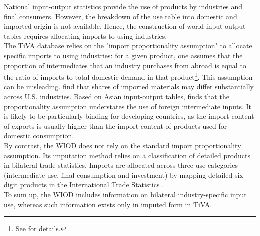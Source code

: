 \documentclass[11pt,a4paper]{article}
\begin{document}
National input-output statistics provide the use of products by industries and final consumers. 
However, the breakdown of the use table into domestic and imported origin is not available. 
Hence, the construction of world input-output tables requires allocating imports to using industries.\\
The TiVA database relies on the "import proportionality assumption" to allocate specific imports to using industries: for a given product, one assumes that the proportion of intermediates that an industry purchases from abroad is equal to the ratio of imports to total domestic demand in that product\footnote{See \cite{OECD2011} for details.}. 
This assumption can be misleading. \cite{Feenstra2012} find that shares of imported materials may differ substantially across U.S. industries. Based on Asian input-output tables, \cite{Puzzello2012} finds that the proportionality assumption understates the use of foreign intermediate inputs. It is likely to be particularly binding for developing countries, as the import content of exports is usually higher than the import content of products used for domestic consumption.\\
By contrast, the WIOD does not rely on the standard import proportionality assumption. 
Its imputation method relies on a classification of detailed products in bilateral trade statistics.
Imports are allocated across three use categories (intermediate use, final consumption and investment) by mapping detailed six-digit products in the International Trade Statistics \citep{Dietzenbacher2013}.\\

To sum up, the WIOD includes information on bilateral industry-specific input use, whereas such information exists only in imputed form in TiVA. 
\end{document}

